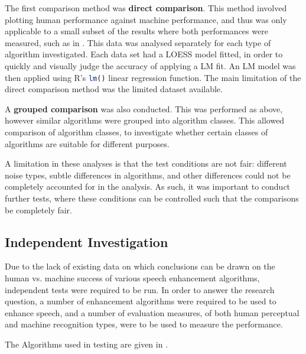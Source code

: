 The first comparison method was \textbf{direct comparison}. This method
involved plotting human performance against machine performance, and
thus was only applicable to a small subset of the results where both
performances were measured, such as in \citep{Paliwal2010}. This
data was analysed separately for each type of algorithm investigated.
Each data set had a \ac{LOESS} model fitted, in order to quickly
and visually judge the accuracy of applying a \ac{LM} fit. An \ac{LM}
model was then applied using R's \lstinline[language=R]!lm()! linear
regression function. The main limitation of the direct comparison
method was the limited dataset available.

A \textbf{grouped comparison} was also conducted. This was performed
as above, however similar algorithms were grouped into algorithm classes.
This allowed comparison of algorithm classes, to investigate whether
certain classes of algorithms are suitable for different purposes.

A limitation in these analyses is that the test conditions are not
fair: different noise types, subtle differences in algorithms, and
other differences could not be completely accounted for in the analysis.
As such, it was important to conduct further tests, where these conditions
can be controlled such that the comparisons be completely fair.


\subsection{Independent Investigation}

Due to the lack of existing data on which conclusions can be drawn
on the human vs. machine success of various speech enhancement algorithms,
independent tests were required to be run. In order to answer the
research question, a number of enhancement algorithms were required
to be used to enhance speech, and a number of evaluation measures,
of both human perceptual and machine recognition types, were to be
used to measure the performance.

The Algorithms used in testing are given in .

